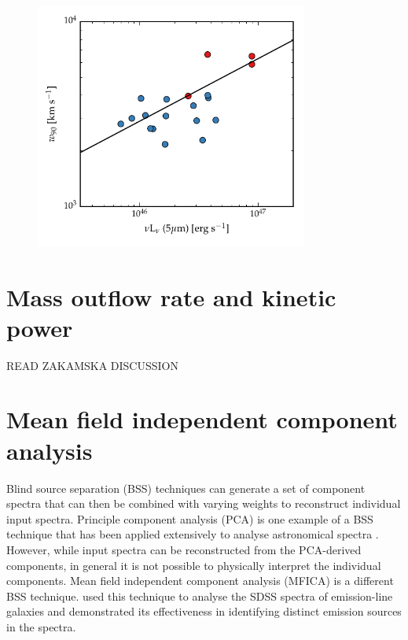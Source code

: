 \begin{figure}
\centering 
    \includegraphics[width=0.8\textwidth]{figures/chapter04/fivemicron_w90.pdf} 
    \caption[{}]{}     
    \label{fig:fivemicron_w90}
\end{figure}

\section{Mass outflow rate and kinetic power}

READ ZAKAMSKA DISCUSSION

\section{Mean field independent component analysis}

Blind source separation (BSS) techniques can generate a set of component spectra that can then be combined with varying weights to reconstruct individual input spectra.
Principle component analysis (PCA) is one example of a BSS technique that has been applied extensively to analyse astronomical spectra \citep[e.g.][]{mittaz90,francis92,yip04}. 
However, while input spectra can be reconstructed from the PCA-derived components, in general it is not possible to physically interpret the individual components. 
Mean field independent component analysis (MFICA) is a different BSS technique. 
\citet{allen13} used this technique to analyse the SDSS spectra of emission-line galaxies and demonstrated its effectiveness in identifying distinct emission sources in the spectra. 

